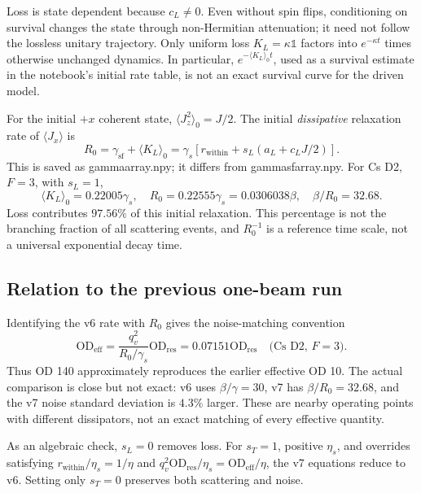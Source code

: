 \documentclass[11pt]{article}
\newcommand{\id}{\mathbb{1}}
\newcommand{\OD}{\mathrm{OD}}
\newcommand{\code}[1]{{\small\ttfamily\def\_{\textunderscore\allowbreak}#1}}
\begin{document}
Loss is state dependent because $c_L\ne0$. Even without spin flips, conditioning
on survival changes the state through non-Hermitian attenuation; it need not
follow the lossless unitary trajectory. Only uniform loss $K_L=\kappa\id$
factors into $e^{-\kappa t}$ times otherwise unchanged dynamics. In particular,
$e^{-\langle K_L\rangle_0t}$, used as a survival estimate in the notebook's
initial rate table, is not an exact survival curve for the driven model.

For the initial $+x$ coherent state, $\langle J_z^2\rangle_0=J/2$. The initial
\emph{dissipative} relaxation rate of $\langle J_x\rangle$ is
\begin{equation}
 R_0=\gamma_{\mathrm{sf}}+\langle K_L\rangle_0
 =\gamma_s[r_{\mathrm{within}}+s_L(a_L+c_LJ/2)].
 \label{eq:R0}
\end{equation}
This is saved as \code{gamma\_array.npy}; it differs from
\code{gamma\_sf\_array.npy}. For Cs D2, $F=3$, with $s_L=1$,
\begin{equation}
 \langle K_L\rangle_0=0.22005\gamma_s,\quad
 R_0=0.22555\gamma_s=0.0306038\beta,\quad \beta/R_0=32.68.
\end{equation}
Loss contributes $97.56\%$ of this initial relaxation. This percentage is not
the branching fraction of all scattering events, and $R_0^{-1}$ is a reference
time scale, not a universal exponential decay time.

\subsection{Relation to the previous one-beam run}

Identifying the v6 rate with $R_0$ gives the noise-matching convention
\begin{equation}
 \OD_{\mathrm{eff}}=
 \frac{q_v^2}{R_0/\gamma_s}\OD_{\mathrm{res}}
 =0.07151\OD_{\mathrm{res}}\quad\text{(Cs D2, $F=3$)}.
\end{equation}
Thus OD 140 approximately reproduces the earlier effective OD 10. The actual
comparison is close but not exact: v6 uses $\beta/\gamma=30$, v7 has
$\beta/R_0=32.68$, and the v7 noise standard deviation is $4.3\%$ larger.
These are nearby operating points with different dissipators, not an exact
matching of every effective quantity.

As an algebraic check, $s_L=0$ removes loss. For $s_T=1$, positive $\eta_s$,
and overrides satisfying $r_{\mathrm{within}}/\eta_s=1/\eta$ and
$q_v^2\OD_{\mathrm{res}}/\eta_s=\OD_{\mathrm{eff}}/\eta$, the v7 equations
reduce to v6. Setting only $s_T=0$ preserves both scattering and noise.
\end{document}
